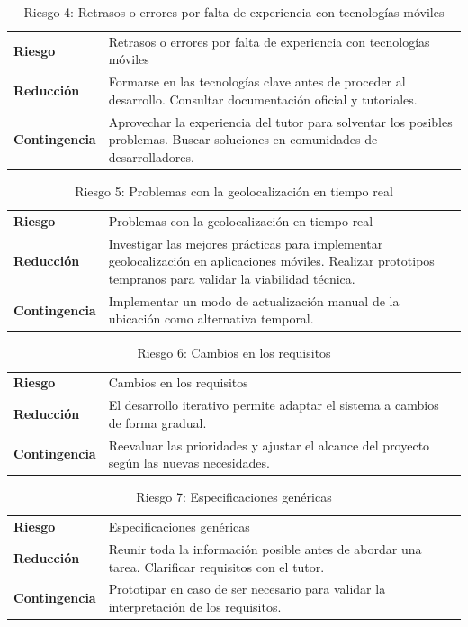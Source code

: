 \begin{table}[ht!]
\centering
\begin{tabular}{@{}p{3cm}p{10cm}@{}}
\textbf{Riesgo} & Retrasos o errores por falta de experiencia con tecnologías móviles \\[0.4em]
\textbf{Reducción} & Formarse en las tecnologías clave antes de proceder al desarrollo. Consultar documentación oficial y tutoriales. \\[0.4em]
\textbf{Contingencia} & Aprovechar la experiencia del tutor para solventar los posibles problemas. Buscar soluciones en comunidades de desarrolladores.
\end{tabular}
\caption{Riesgo 4: Retrasos o errores por falta de experiencia con tecnologías móviles}
\label{tab:riesgo4}
\end{table}

\begin{table}[ht!]
\centering
\begin{tabular}{@{}p{3cm}p{10cm}@{}}
\textbf{Riesgo} & Problemas con la geolocalización en tiempo real \\[0.4em]
\textbf{Reducción} & Investigar las mejores prácticas para implementar geolocalización en aplicaciones móviles. Realizar prototipos tempranos para validar la viabilidad técnica. \\[0.4em]
\textbf{Contingencia} & Implementar un modo de actualización manual de la ubicación como alternativa temporal.
\end{tabular}
\caption{Riesgo 5: Problemas con la geolocalización en tiempo real}
\label{tab:riesgo5}
\end{table}

\begin{table}[ht!]
\centering
\begin{tabular}{@{}p{3cm}p{10cm}@{}}
\textbf{Riesgo} & Cambios en los requisitos \\[0.4em]
\textbf{Reducción} & El desarrollo iterativo permite adaptar el sistema a cambios de forma gradual. \\[0.4em]
\textbf{Contingencia} & Reevaluar las prioridades y ajustar el alcance del proyecto según las nuevas necesidades.
\end{tabular}
\caption{Riesgo 6: Cambios en los requisitos}
\label{tab:riesgo6}
\end{table}

\begin{table}[ht!]
\centering
\begin{tabular}{@{}p{3cm}p{10cm}@{}}
\textbf{Riesgo} & Especificaciones genéricas \\[0.4em]
\textbf{Reducción} & Reunir toda la información posible antes de abordar una tarea. Clarificar requisitos con el tutor. \\[0.4em]
\textbf{Contingencia} & Prototipar en caso de ser necesario para validar la interpretación de los requisitos.
\end{tabular}
\caption{Riesgo 7: Especificaciones genéricas}
\label{tab:riesgo7}
\end{table}

